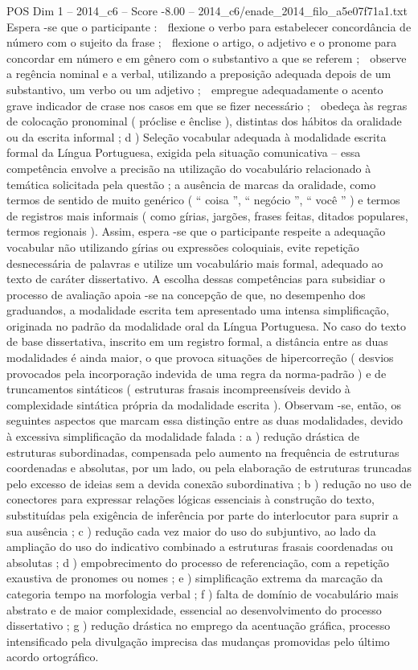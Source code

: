 \begin{textsample}{POS Dim 1 – 2014\_c6 – Score -8.00 – 2014\_c6/enade\_2014\_filo\_a5e07f71a1.txt}
Espera -se que o participante :  flexione o verbo para estabelecer concordância de número com o sujeito da frase ;  flexione o artigo, o adjetivo e o pronome para concordar em número e em gênero com o substantivo a que se referem ;  observe a regência nominal e a verbal, utilizando a preposição adequada depois de um substantivo, um verbo ou um adjetivo ;  empregue adequadamente o acento grave indicador de crase nos casos em que se fizer necessário ;  obedeça às regras de colocação pronominal ( próclise e ênclise ), distintas dos hábitos da oralidade ou da escrita informal ; d ) Seleção vocabular adequada à modalidade escrita formal da Língua Portuguesa, exigida pela situação comunicativa – essa competência envolve a precisão na utilização do vocabulário relacionado à temática solicitada pela questão ; a ausência de marcas da oralidade, como termos de sentido de muito genérico ( “ coisa ”, “ negócio ”, “ você ” ) e termos de registros mais informais ( como gírias, jargões, frases feitas, ditados populares, termos regionais ).
Assim, espera -se que o participante respeite a adequação vocabular não utilizando gírias ou expressões coloquiais, evite repetição desnecessária de palavras e utilize um vocabulário mais formal, adequado ao texto de caráter dissertativo.
A escolha dessas competências para subsidiar o processo de avaliação apoia -se na concepção de que, no desempenho dos graduandos, a modalidade escrita tem apresentado uma intensa simplificação, originada no padrão da modalidade oral da Língua Portuguesa.
No caso do texto de base dissertativa, inscrito em um registro formal, a distância entre as duas modalidades é ainda maior, o que provoca situações de hipercorreção ( desvios provocados pela incorporação indevida de uma regra da norma-padrão ) e de truncamentos sintáticos ( estruturas frasais incompreensíveis devido à complexidade sintática própria da modalidade escrita ).
Observam -se, então, os seguintes aspectos que marcam essa distinção entre as duas modalidades, devido à excessiva simplificação da modalidade falada : a ) redução drástica de estruturas subordinadas, compensada pelo aumento na frequência de estruturas coordenadas e absolutas, por um lado, ou pela elaboração de estruturas truncadas pelo excesso de ideias sem a devida conexão subordinativa ; b ) redução no uso de conectores para expressar relações lógicas essenciais à construção do texto, substituídas pela exigência de inferência por parte do interlocutor para suprir a sua ausência ; c ) redução cada vez maior do uso do subjuntivo, ao lado da ampliação do uso do indicativo combinado a estruturas frasais coordenadas ou absolutas ; d ) empobrecimento do processo de referenciação, com a repetição exaustiva de pronomes ou nomes ; e ) simplificação extrema da marcação da categoria tempo na morfologia verbal ; f ) falta de domínio de vocabulário mais abstrato e de maior complexidade, essencial ao desenvolvimento do processo dissertativo ; g ) redução drástica no emprego da acentuação gráfica, processo intensificado pela divulgação imprecisa das mudanças promovidas pelo último acordo ortográfico.

\end{textsample}

